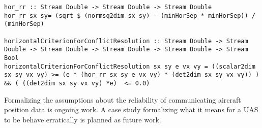 %
%
%
%
\begin{lstlisting}[frame=single]
hor_rr :: Stream Double -> Stream Double -> Stream Double
hor_rr sx sy= (sqrt $ (normsq2dim sx sy) - (minHorSep * minHorSep)) / (minHorSep)

horizontalCriterionForConflictResolution :: Stream Double -> Stream Double -> Stream Double -> Stream Double -> Stream Double -> Stream Bool
horizontalCriterionForConflictResolution sx sy e vx vy = ((scalar2dim sx sy vx vy) >= (e * (hor_rr sx sy e vx vy) * (det2dim sx sy vx vy)) ) && ( ((det2dim sx sy vx vy) *e)  <= 0.0)
\end{lstlisting}

Formalizing the assumptions about the reliability of communicating
aircraft position data is ongoing work.  A case study formalizing what
it means for a UAS to be behave erratically is planned as future
work.  


%
%
%


